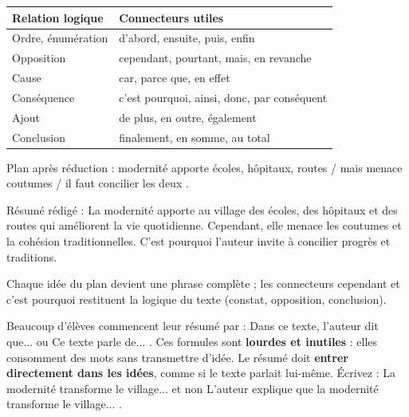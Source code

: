 \documentclass[11pt]{article}
\begin{document}
\begin{center}
\begin{tabularx}{\linewidth}{|l|X|}\hline
\rowcolor{popblueL} \textbf{Relation logique} & \textbf{Connecteurs utiles} \\ \hline
Ordre, énumération & d'abord, ensuite, puis, enfin \\ \hline
Opposition & cependant, pourtant, mais, en revanche \\ \hline
Cause & car, parce que, en effet \\ \hline
Conséquence & c'est pourquoi, ainsi, donc, par conséquent \\ \hline
Ajout & de plus, en outre, également \\ \hline
Conclusion & finalement, en somme, au total \\ \hline
\end{tabularx}
\end{center}

\begin{exemplebox}
Plan après réduction : \og modernité apporte écoles, hôpitaux, routes / mais menace coutumes / il faut concilier les deux \fg{}.

Résumé rédigé : \og La modernité apporte au village des écoles, des hôpitaux et des routes qui améliorent la vie quotidienne. Cependant, elle menace les coutumes et la cohésion traditionnelles. C'est pourquoi l'auteur invite à concilier progrès et traditions. \fg{}

Chaque idée du plan devient une phrase complète ; les connecteurs \og cependant \fg{} et \og c'est pourquoi \fg{} restituent la logique du texte (constat, opposition, conclusion).
\end{exemplebox}

\begin{attention}
Beaucoup d'élèves commencent leur résumé par : \og Dans ce texte, l'auteur dit que... \fg{} ou \og Ce texte parle de... \fg{}. Ces formules sont \textbf{lourdes et inutiles} : elles consomment des mots sans transmettre d'idée. Le résumé doit \textbf{entrer directement dans les idées}, comme si le texte parlait lui-même. Écrivez : \og La modernité transforme le village... \fg{} et non \og L'auteur explique que la modernité transforme le village... \fg{}.
\end{attention}
\end{document}
